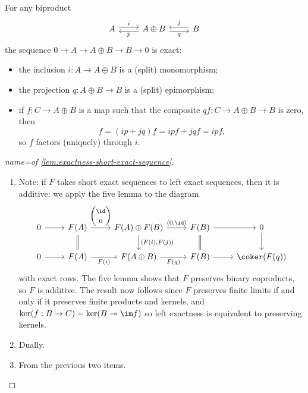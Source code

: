 \begin{rmk}
For any biproduct
\begin{equation*}
  \begin{tikzcd}
    A \ar[r, shift left, "i"] & A\oplus B \ar[l, shift left, "p"] \ar[r, shift right, "q"'] & B \ar[l, shift right, "j"']
  \end{tikzcd}
\end{equation*}
the sequence \(0\to A\to A\oplus B\to B\to 0\) is exact:
\begin{itemize}
\item the inclusion \(i\colon A\to A\oplus B\) is a (split) monomorphism;
\item the projection \(q\colon A\oplus B\to B\) is a (split) epimorphism;
\item if \(f\colon C\to A\oplus B\) is a map such that the composite \(qf\colon C\to A\oplus B\to B\) is zero, then
  \[ f = (ip+jq)f = ipf+jqf = ipf\text{,} \]
  so \(f\) factors (uniquely) through \(i\).
\end{itemize}
\end{rmk}

\begin{proof}[name={of \cref{lem:exactness-short-exact-sequence}}]
\begin{enumerate}
\item
  Note: if \(F\) takes short exact sequences to left exact sequences, then it is additive: we apply the five lemma to the diagram
  \begin{equation*}
    \begin{tikzcd}
      0 \ar[r] & F(A) \ar[r, "{\begin{pmatrix} \id \\ 0 \end{pmatrix}}"] \ar[d, equal] & F(A)\oplus F(B) \ar[d, "{(F(i),F(j))}"] \ar[r, "{(0,\id)}"] & F(B) \ar[d, equal] \ar[r] & 0 \ar[d] \\
      0 \ar[r] & F(A) \ar[r, "F(i)"'] & F(A\oplus B) \ar[r, "F(q)"'] & F(B) \ar[r] & \coker(F(q))
    \end{tikzcd}
  \end{equation*}
  with exact rows.
  The five lemma shows that \(F\) preserves binary coproducts, so \(F\) is additive.
  The result now follows since \(F\) preserves finite limits if and only if it preserves finite products and kernels, and \(\ker(f\colon B\to C)=\ker(B\twoheadrightarrow\im f)\) so left exactness is equivalent to preserving kernels.
\item Dually.
\item From the previous two items. \qedhere
\end{enumerate}
\end{proof}

